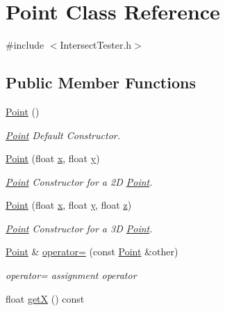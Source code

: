 \hypertarget{class_point}{}\section{Point Class Reference}
\label{class_point}


{\ttfamily \#include $<$Intersect\+Tester.\+h$>$}

\subsection*{Public Member Functions}
\begin{DoxyCompactItemize}
\item 
\hyperlink{class_point_ad92f2337b839a94ce97dcdb439b4325a}{Point} ()
\begin{DoxyCompactList}\small\item\em \hyperlink{class_point}{Point} Default Constructor. \end{DoxyCompactList}\item 
\hyperlink{class_point_a30bc8409287de4f43e160664be834636}{Point} (float \hyperlink{class_point_a05dfe2dfbde813ad234b514f30e662f1}{x}, float \hyperlink{class_point_a6101960c8d2d4e8ea1d32c9234bbeb8d}{y})
\begin{DoxyCompactList}\small\item\em \hyperlink{class_point}{Point} Constructor for a 2D \hyperlink{class_point}{Point}. \end{DoxyCompactList}\item 
\hyperlink{class_point_a405838cb39b8fb6119633d9ba7e6b4fb}{Point} (float \hyperlink{class_point_a05dfe2dfbde813ad234b514f30e662f1}{x}, float \hyperlink{class_point_a6101960c8d2d4e8ea1d32c9234bbeb8d}{y}, float \hyperlink{class_point_a9a666531e0e99adff132be93d2407d0c}{z})
\begin{DoxyCompactList}\small\item\em \hyperlink{class_point}{Point} Constructor for a 3D \hyperlink{class_point}{Point}. \end{DoxyCompactList}\item 
\hyperlink{class_point}{Point} \& \hyperlink{class_point_a0e75bb40a406c615b5632f36fa035a47}{operator=} (const \hyperlink{class_point}{Point} \&other)
\begin{DoxyCompactList}\small\item\em operator= assignment operator \end{DoxyCompactList}\item 
float \hyperlink{class_point_a29c44ec7c7279e02629645a06cdaf7d5}{getX} () const

\end{DoxyCompactItemize}
